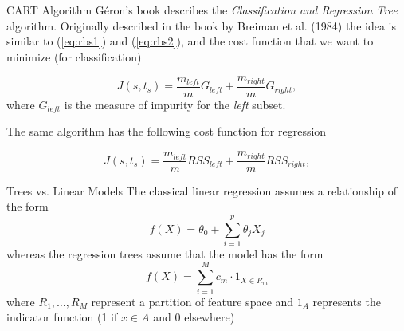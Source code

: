 \documentclass{beamer}
\begin{document}
\begin{frame}{CART Algorithm}
	G\'eron's book describes the {\it Classification and Regression Tree}  algorithm. Originally described in the book by Breiman et al. (1984) the idea is similar to (\ref{eq:rbs1}) and (\ref{eq:rbs2}), and the cost function that we want to minimize (for classification)
	
	\begin{equation}
		J(s,t_s) = \frac{m_{left}}{m} G_{left}+ \frac{m_{right}}{m} G_{right},
	\end{equation}
where $G_{left}$ is the measure of impurity for the {\it left} subset. 

The same algorithm has the following cost function for regression 

\begin{equation*}
	J(s,t_s)= \frac{m_{left}}{m} RSS_{left}+ \frac{m_{right}}{m} RSS_{right},
\end{equation*}

\end{frame}

\begin{frame}{Trees vs. Linear Models}
	The classical linear regression assumes a relationship of the form
	\begin{equation*}
		f(X)= \theta_0 + \sum_{i=1}^p \theta_j X_j
	\end{equation*}
whereas the regression trees assume that the model has the form
\begin{equation*}
	f(X)=\sum_{i=1}^M c_m \cdot 1_{X \in R_m}
\end{equation*}
where $R_1,\ldots,R_M$ represent a partition of feature space and $1_A$ represents the indicator function (1 if $x\in A$ and 0 elsewhere)
\end{frame}
\end{document}
